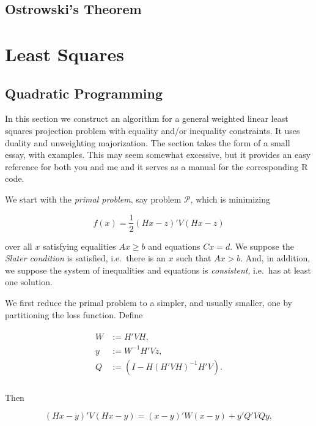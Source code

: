 \documentclass[
  12pt,
]{book}
\theoremstyle{definition}
\theoremstyle{definition}
\theoremstyle{definition}
\theoremstyle{definition}
\theoremstyle{remark}
\begin{document}
\hypertarget{ostrowski}{%
\subsection{Ostrowski's Theorem}\label{ostrowski}}

\hypertarget{mathls}{%
\section{Least Squares}\label{mathls}}

\hypertarget{mathquprog}{%
\subsection{Quadratic Programming}\label{mathquprog}}

In this section we construct an algorithm for
a general weighted linear least squares projection problem with equality and/or inequality constraints. It uses duality and unweighting majorization. The section takes the form of a small essay, with examples. This may seem somewhat excessive, but it provides an easy reference for both you and me and it serves as a manual for the corresponding R code.

We start with the \emph{primal problem}, say problem \(\mathcal{P}\), which is minimizing

\begin{equation}
f(x)=\frac12(Hx-z)'V(Hx-z)
\label{eq:qpbase}
\end{equation}

over all \(x\) satisfying equalities \(Ax\geq b\) and equations \(Cx=d\). We suppose the \emph{Slater condition} is satisfied, i.e.~there is an \(x\) such that \(Ax>b\). And, in addition, we suppose the system of inequalities and equations is \emph{consistent}, i.e.~has at least one solution.

We first reduce the primal problem to a simpler, and usually smaller, one by partitioning the loss function. Define

\begin{align}
\begin{split}
W&:=H'VH,\\
y&:=W^{-1}H'Vz,\\
Q&:=(I-H(H'VH)^{-1}H'V).\\
\end{split}
\label{eq:qpfirstpart}
\end{align}

Then

\begin{equation}
(Hx-y)'V(Hx-y)=(x-y)'W(x-y)+y'Q'VQy,
\label{eq:qpsimple}
\end{equation}
\end{document}
